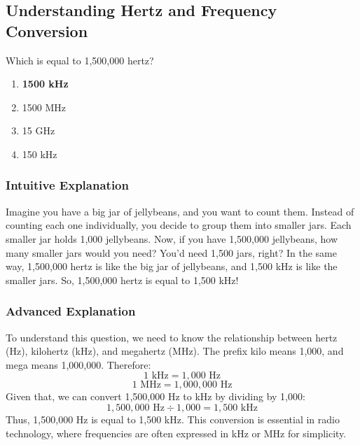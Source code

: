 \subsection{Understanding Hertz and Frequency Conversion}\label{T5B02}

\begin{tcolorbox}[colback=gray!10!white,colframe=black!75!black,title=T5B02]
Which is equal to 1,500,000 hertz?
\begin{enumerate}[label=\Alph*)]
    \item \textbf{1500 kHz}
    \item 1500 MHz
    \item 15 GHz
    \item 150 kHz
\end{enumerate}
\end{tcolorbox}

\subsubsection{Intuitive Explanation}
Imagine you have a big jar of jellybeans, and you want to count them. Instead of counting each one individually, you decide to group them into smaller jars. Each smaller jar holds 1,000 jellybeans. Now, if you have 1,500,000 jellybeans, how many smaller jars would you need? You'd need 1,500 jars, right? In the same way, 1,500,000 hertz is like the big jar of jellybeans, and 1,500 kHz is like the smaller jars. So, 1,500,000 hertz is equal to 1,500 kHz!

\subsubsection{Advanced Explanation}
To understand this question, we need to know the relationship between hertz (Hz), kilohertz (kHz), and megahertz (MHz). The prefix kilo means 1,000, and mega means 1,000,000. Therefore:
\[
1 \text{ kHz} = 1,000 \text{ Hz}
\]
\[
1 \text{ MHz} = 1,000,000 \text{ Hz}
\]
Given that, we can convert 1,500,000 Hz to kHz by dividing by 1,000:
\[
1,500,000 \text{ Hz} \div 1,000 = 1,500 \text{ kHz}
\]
Thus, 1,500,000 Hz is equal to 1,500 kHz. This conversion is essential in radio technology, where frequencies are often expressed in kHz or MHz for simplicity.

